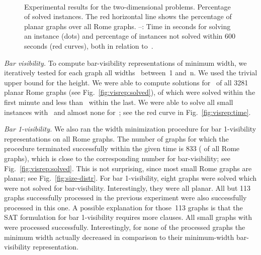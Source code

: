 \documentclass[runningheads]{llncs}
\begin{document}
\begin{figure}[t]
 \hfill
 \\
 \hfill
 \caption{\small Experimental results for the two-dimensional problems.
  \protect{} 
   Percentage of solved instances. The red horizontal line shows the
   percentage of planar graphs over all Rome graphs.
  \protect{}--\protect{}:  
   Time in seconds for solving an instance (dots)
   and percentage of instances not solved within 600 seconds (red curves), 
   both in relation to~.
 }\label{fig:2d}
	\vspace{-2ex}
\end{figure} 


\smallskip\noindent\textit{Bar visibility.}
To compute bar-visibility representations of minimum width,
we iteratively tested for each graph all widths~
between~1 and~n. We used the trivial upper bound  for the height.
We were able to compute solutions
for~ of all 3281 planar Rome graphs (see
Fig.~\ref{fig:visrep:solved}),  of which were solved within the
first minute and less than~ within the last.
We were able to solve all small instances with~
and almost none for~; see the red curve in
Fig.~\ref{fig:visrep:time}.
\par


\smallskip\noindent\textit{Bar 1-visibility.} We also ran the width minimization procedure for 
bar 1-visibility representations on all Rome graphs. 
The number of graphs for which the procedure terminated successfully
within the given time is 833 ( of all Rome graphs),
which is close to the corresponding number for bar-visibility; see
Fig.~\ref{fig:visrep:solved}. 
 This is not surprising, since most small Rome graphs are planar;
 see Fig.~\ref{fig:size-distr}. 
For bar 1-visibility, eight graphs were solved 
which were not solved for bar-visibility.
Interestingly, they were all planar.
All but 113 graphs successfully processed in the previous
experiment 
were also successfully processed in this one. 
A possible explanation for those~113 graphs is that the SAT formulation for
 bar 1-visibility requires more clauses.
All small graphs with  were processed successfully.
Interestingly, for none of the processed graphs
the minimum width actually decreased in comparison to their
minimum-width bar-visibility representation.
\end{document}
